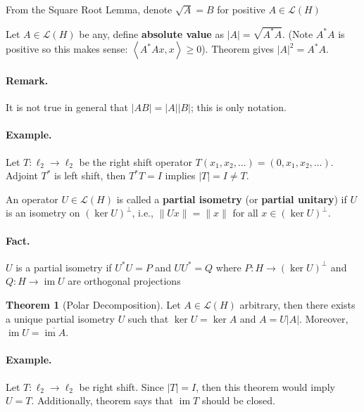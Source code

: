 \documentclass[12pt]{article}
\newcommand{\keyword}[1]{\textbf{#1}}
\theoremstyle{definition}
\newtheorem{theorem}{Theorem}
\newcommand{\LL}{\mathcal{L}}
\newcommand{\<}{\left\langle}
\renewcommand{\>}{\right\rangle}
\DeclareMathOperator{\im}{im}
\newcommand{\clo}{\overline}
\begin{document}
From the Square Root Lemma, denote $\sqrt{A} = B$ for positive $A \in \LL(H)$

Let $A \in \LL(H)$ be any, define \keyword{absolute value} as $|A| = \sqrt{A^*A}$.
(Note $A^*A$ is positive so this makes sense: $\<A^*Ax, x\> \geq 0$).
Theorem gives $|A|^2 = A^*A$.

\paragraph{Remark.}
It is not true in general that $|AB| = |A||B|$; this is only notation.

\paragraph{Example.}
Let $T : \ell_2 \to \ell_2$ be the right shift operator $T(x_1, x_2, \dots) = (0, x_1, x_2, \dots)$.
Adjoint $T^*$ is left shift, then $T^*T = I$ implies $|T| = I \ne T$.

An operator $U \in \LL(H)$ is called a \keyword{partial isometry} (or \keyword{partial unitary}) if $U$ is an isometry on $(\ker U)^\perp$, i.e., $\|Ux\| = \|x\|$ for all $x \in (\ker U)^\perp$.

\paragraph{Fact.}
$U$ is a partial isometry if $U^*U = P$ and $UU^* = Q$ where $P : H \to (\ker U)^\perp$ and $Q : H \to \im U$ are orthogonal projections


\begin{theorem}[Polar Decomposition]
    Let $A \in \LL(H)$ arbitrary, then there exists a unique partial isometry $U$ such that $\ker U = \ker A$ and $A = U|A|$.
    Moreover, $\im U = \clo{\im A}$.
\end{theorem}

\paragraph{Example.}
Let $T : \ell_2 \to \ell_2$ be right shift.
Since $|T| = I$, then this theorem would imply $U = T$.
Additionally, theorem says that $\im T$ should be closed.
\end{document}
